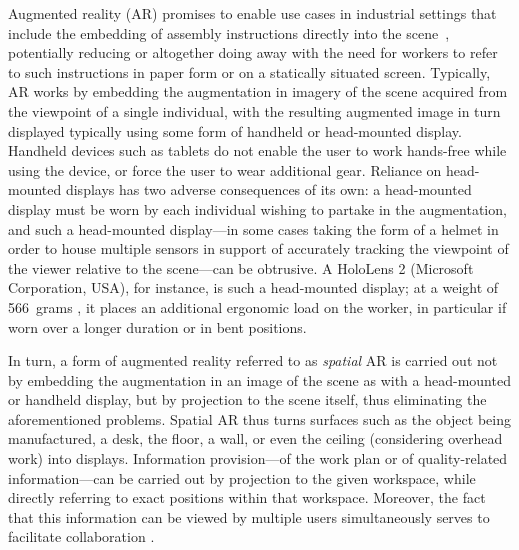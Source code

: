 \documentclass[review]{elsarticle}
\begin{document}
Augmented reality (AR) \cite{van2010survey,zhou2008trends} promises to enable use cases in industrial settings that include the embedding of assembly instructions directly into the scene~\cite{schlund2018moglichkeiten,uva2018evaluating,masood2019augmented,gattullo2019towards,aschenbrenner2019comparing,mayrhofer2019one,rupprecht2020information,Rupprecht2021}, potentially reducing or altogether doing away with the need for workers to refer to such instructions in paper form or on a statically situated screen. Typically, AR works by embedding the augmentation in imagery of the scene acquired from the viewpoint of a single individual, with the resulting augmented image in turn displayed typically using some form of handheld or head-mounted display. Handheld devices such as tablets do not enable the user to work hands-free while using the device, or force the user to wear additional gear. Reliance on head-mounted displays has two adverse consequences of its own: a head-mounted display must be worn by each individual wishing to partake in the augmentation, and such a head-mounted display---in some cases taking the form of a helmet in order to house multiple sensors in support of accurately tracking the viewpoint of the viewer relative to the scene---can be obtrusive. A HoloLens 2 (Microsoft Corporation, USA), for instance, is such a head-mounted display; at a weight of 566~grams \cite{hololens}, it places an additional ergonomic load on the worker, in particular if worn over a longer duration or in bent positions.

In turn, a form of augmented reality referred to as \textit{spatial} AR\cite{bimber2019spatial} is carried out not by embedding the augmentation in an image of the scene as with a head-mounted or handheld display, but by projection to the scene itself, thus eliminating the aforementioned problems. Spatial AR thus turns surfaces such as the object being manufactured, a desk, the floor, a wall, or even the ceiling (considering overhead work) into displays. Information provision---of the work plan or of quality-related information---can be carried out by projection to the given workspace, while directly referring to exact positions within that workspace. Moreover, the fact that this information can be viewed by multiple users simultaneously serves to facilitate collaboration \cite{aschenbrenner2019comparing}.
\end{document}
